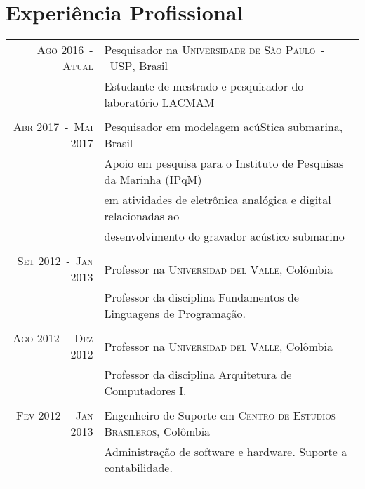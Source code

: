 \documentclass[a4paper,10pt]{article}
\begin{document}
\section{Experiência Profissional}
\begin{longtable}{rl}

    \textsc{Ago 2016~-~Atual}       & Pesquisador na \textsc{Universidade de São Paulo~-~USP}, Brasil \\
                                    &\footnotesize{Estudante de mestrado e pesquisador do laboratório LACMAM} \\
                                    &\\

    \textsc{Abr 2017~-~Mai 2017}    & Pesquisador em modelagem acúStica submarina, Brasil \\
                                    &\footnotesize{Apoio em pesquisa para o Instituto de Pesquisas da Marinha (IPqM)} \\
                                    &\footnotesize{em atividades de eletrônica analógica e digital relacionadas ao} \\
                                    &\footnotesize{desenvolvimento do gravador acústico submarino} \\
                                    &\\

    \textsc{Set 2012~-~Jan 2013}    & Professor na \textsc{Universidad del Valle}, Colômbia \\
                                    &\footnotesize{Professor da disciplina Fundamentos de Linguagens de Programação.} \\
                                    &\\

    \textsc{Ago 2012~-~Dez 2012}    & Professor na \textsc{Universidad del Valle}, Colômbia \\
                                    &\footnotesize{Professor da disciplina Arquitetura de Computadores I.} \\
                                    &\\

    \textsc{Fev 2012~-~Jan 2013}    & Engenheiro de Suporte em \textsc{Centro de Estudios Brasileros}, Colômbia \\
                                    &\footnotesize{Administração de software e hardware. Suporte a contabilidade.} \\
                                    &\\

\end{longtable}
\end{document}
